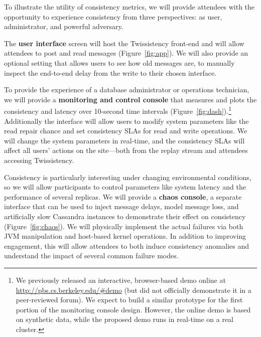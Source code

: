 
To illustrate the utility of consistency metrics, we will provide
attendees with the opportunity to experience consistency from three
perspectives: as user, administrator, and powerful adversary.

The \textbf{user interface} screen will host the Twissistency
front-end and will allow attendees to post and read messages
(Figure~\ref{fig:app}). We will also provide an optional setting that
allows users to see how old messages are, to manually inspect the
end-to-end delay from the write to their chosen interface.

To provide the experience of a database administrator or operations
technician, we will provide a \textbf{monitoring and control console}
that measures and plots the consistency and latency over 10-second
time intervals (Figure~\ref{fig:dash}).\footnote{We previously
  released an interactive, browser-based demo online at
  \url{http://pbs.cs.berkeley.edu/#demo} (but did not officially
  demonstrate it in a peer-reviewed forum). We expect to build a
  similar prototype for the first portion of the monitoring console
  design. However, the online demo is based on synthetic data, while
  the proposed demo runs in real-time on a real cluster.} Additionally
the interface will allow users to modify system parameters like
the read repair chance and set consistency SLAs for read and write
operations. We will change the system parameters in real-time, and the
consistency SLAs will affect all users' actions on the site---both
from the replay stream and attendees accessing Twissistency.

Consistency is particularly interesting under changing environmental
conditions, so we will allow participants to control parameters like
system latency and the performance of several replicas. We will provide
a \textbf{chaos console}, a separate interface that can be used to
inject message delays, model message loss, and artificially
slow Cassandra instances to demonstrate their effect on consistency
(Figure~\ref{fig:chaos}). We will physically implement the actual failures via
both JVM manipulation and host-based kernel operations. In addition to
improving engagement, this will allow attendees to both induce
consistency anomalies and understand the impact of several common
failure modes.
